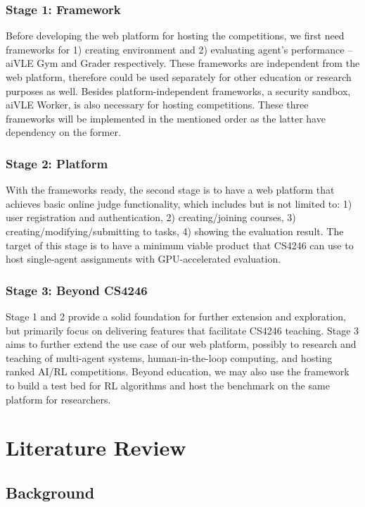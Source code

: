 \documentclass[fyp]{socreport}
\begin{document}
\subsection{Stage 1: Framework}
Before developing the web platform for hosting the competitions, we first need frameworks for 1) creating environment and 2) evaluating agent’s performance – aiVLE Gym and Grader respectively. These frameworks are independent from the web platform, therefore could be used separately for other education or research purposes as well.
Besides platform-independent frameworks, a security sandbox, aiVLE Worker, is also necessary for hosting competitions. These three frameworks will be implemented in the mentioned order as the latter have dependency on the former.
\subsection{Stage 2: Platform}
With the frameworks ready, the second stage is to have a web platform that achieves basic online judge functionality, which includes but is not limited to: 1) user registration and authentication, 2) creating/joining courses, 3) creating/modifying/submitting to tasks, 4) showing the evaluation result. The target of this stage is to have a minimum viable product that CS4246 can use to host single-agent assignments with GPU-accelerated evaluation.
\subsection{Stage 3: Beyond CS4246}
Stage 1 and 2 provide a solid foundation for further extension and exploration, but primarily focus on delivering features that facilitate CS4246 teaching. Stage 3 aims to further extend the use case of our web platform, possibly to research and teaching of multi-agent systems, human-in-the-loop computing, and hosting ranked AI/RL competitions. Beyond education, we may also use the framework to build a test bed for RL algorithms and host the benchmark on the same platform for researchers.

\chapter{Literature Review}
\label{ch:literature-review}
\section{Background}
\end{document}
